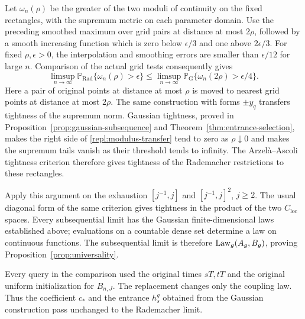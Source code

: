 Let $\omega_n(\rho)$ be the greater of the two moduli of continuity on
the fixed rectangles, with the supremum metric on each parameter domain.
Use the preceding smoothed maximum over grid pairs at distance at most
$2\rho$, followed by a smooth increasing function which is zero below
$\epsilon/3$ and one above $2\epsilon/3$.  For fixed $\rho,\epsilon>0$,
the interpolation and smoothing errors are smaller than $\epsilon/12$
for large $n$.  Comparison of the actual grid tests consequently gives
\begin{equation}\label{repl:modulus-transfer}
 \limsup_{n\to\infty}\mathbb P_{\mathrm{Rad}}\{\omega_n(\rho)>\epsilon\}
 \le
 \limsup_{n\to\infty}\mathbb P_{\mathrm{G}}\{\omega_n(2\rho)>\epsilon/4\}.
\end{equation}
Here a pair of original points at distance at most $\rho$ is moved to
nearest grid points at distance at most $2\rho$.  The same construction
with forms $\pm y_q$ transfers tightness of the supremum norm.  Gaussian
tightness, proved in Proposition~\ref{prop:gaussian-subsequence} and Theorem~\ref{thm:entrance-selection},
makes the right side of \eqref{repl:modulus-transfer} tend to zero as
$\rho\downarrow0$ and makes the supremum tails vanish as their threshold
tends to infinity.  The Arzel\`a--Ascoli tightness criterion therefore
gives tightness of the Rademacher restrictions to these rectangles.

Apply this argument on the exhaustion
$[j^{-1},j]$ and $[j^{-1},j]^2$, $j\ge2$.  The usual diagonal form of
the same criterion gives tightness in the product of the two
$C_{\mathrm{loc}}$ spaces.  Every subsequential limit has the Gaussian
finite-dimensional laws established above; evaluations on a countable
dense set determine a law on continuous functions.  The subsequential
limit is therefore $\operatorname{Law}_g(A_g,B_g)$, proving
Proposition~\ref{prop:universality}.

Every query in the comparison used the original times $sT,tT$ and the
original uniform initialization for $B_{n,J}$.  The replacement changes
only the coupling law.  Thus the coefficient $c_*$ and the entrance
$h_s^g$ obtained from the Gaussian construction pass unchanged to the
Rademacher limit.
